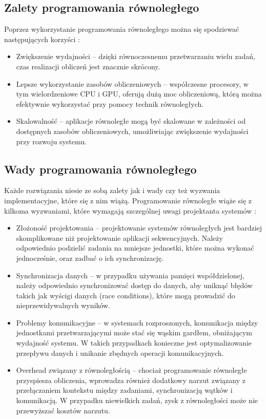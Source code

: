 \subsection{Zalety programowania równoległego}
Poprzez wykorzystanie programowania równoległego można się spodziewać następujących korzyści \cite{ParallelProgramming}:
\begin{itemize}
    \item Zwiększenie wydajności – dzięki równoczesnemu przetwarzaniu wielu zadań, czas realizacji obliczeń jest znacznie skrócony.
    \item Lepsze wykorzystanie zasobów obliczeniowych – współczesne procesory, w tym wielordzeniowe CPU i GPU, oferują dużą moc obliczeniową, którą można efektywnie wykorzystać przy pomocy technik równoległych.
    \item Skalowalność – aplikacje równoległe mogą być skalowane w zależności od dostępnych zasobów obliczeniowych, umożliwiając zwiększenie wydajności przy rozwoju systemu.
\end{itemize}

\subsection{Wady programowania równoległego}
Każde rozwiązania niesie ze sobą zalety jak i wady czy też wyzwania implementacyjne, które się z nim wiążą. Programowanie równoległe wiąże się z kilkoma wyzwaniami, które wymagają szczególnej uwagi projektanta systemów \cite{ParallelProgramming, CUDA}:
\begin{itemize}
    \item Złożoność projektowania – projektowanie systemów równoległych jest bardziej skomplikowane niż projektowanie aplikacji sekwencyjnych. Należy odpowiednio podzielić zadania na mniejsze jednostki, które można wykonać jednocześnie, oraz zadbać o ich synchronizację.
    \item Synchronizacja danych – w przypadku używania pamięci współdzielonej, należy odpowiednio synchronizować dostęp do danych, aby uniknąć błędów takich jak wyścigi danych (race conditions), które mogą prowadzić do nieprzewidywalnych wyników.
    \item Problemy komunikacyjne – w systemach rozproszonych, komunikacja między jednostkami przetwarzającymi może stać się wąskim gardłem, obniżającym wydajność systemu. W takich przypadkach konieczne jest optymalizowanie przepływu danych i unikanie zbędnych operacji komunikacyjnych.
    \item Overhead związany z równoległością – chociaż programowanie równoległe przyspiesza obliczenia, wprowadza również dodatkowy narzut związany z przełączaniem kontekstu między zadaniami, synchronizacją wątków i komunikacją. W przypadku niewielkich zadań, zysk z równoległości może nie przewyższać kosztów narzutu.
\end{itemize}



